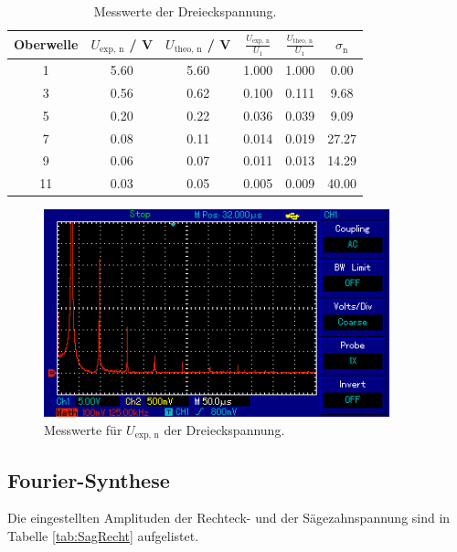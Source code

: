 \begin{table}[H] %
  \centering
  \begin{tabular}{c | c | c | c | c | c}
    \toprule
    Oberwelle & $U_\text{exp, n}$ / V & $U_\text{theo, n}$ / V & $\frac{U_\text{exp, n}}{U_1}$ & $\frac{U_\text{theo, n}}{U_1}$ & $\sigma_\text{n}$ \\
    \midrule
    1  & 5.60 & 5.60 & 1.000 & 1.000 & 0.00 \\
    3  & 0.56 & 0.62 & 0.100 & 0.111 & 9.68 \\
    5  & 0.20 & 0.22 & 0.036 & 0.039 & 9.09 \\
    7  & 0.08 & 0.11 & 0.014 & 0.019 & 27.27\\
    9  & 0.06 & 0.07 & 0.011 & 0.013 & 14.29\\
    11 & 0.03 & 0.05 & 0.005 & 0.009 & 40.00\\
    \bottomrule
  \end{tabular}
  \caption{Messwerte der Dreieckspannung.}
  \label{tab:Drei}
\end{table}

\begin{figure}[H]
  \centering
  \includegraphics[height=6cm]{picture/DreieckB.PNG}
  \caption{Messwerte für $U_\text{exp, n}$ der Dreieckspannung.}
  \label{fig:DreieckB}
\end{figure}

\newpage
\subsection{Fourier-Synthese}
\label{sec:Synthese}
Die eingestellten Amplituden der Rechteck- und der Sägezahnspannung sind in Tabelle \ref{tab:SagRecht} aufgelistet.

